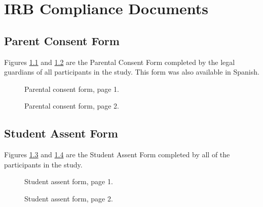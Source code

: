 \chapter{IRB Compliance Documents}


\section{Parent Consent Form}  \label{sec:parent_consent}
	Figures \ref{fig:consent1} and \ref{fig:consent2} are the Parental Consent Form completed by the legal guardians of all participants in the study. This form was also available in Spanish.
	

	
	\begin{figure}%
   	\centering
   	\caption{Parental consent form, page 1.}
   	\label{fig:consent1}
	\end{figure}

	\begin{figure}%
   	\centering
   	\caption{Parental consent form, page 2.}
   	\label{fig:consent2}
	\end{figure}

\section{Student Assent Form} \label{sec:student_assent}
	
	Figures \ref{fig:assent1} and \ref{fig:assent2} are the Student Assent Form completed by all of the participants in the study. 

	
	\begin{figure}%
   	\centering
   	\caption{Student assent form, page 1.}
   	\label{fig:assent1}
	\end{figure}
	
	\begin{figure}%
   	\centering
   	\caption{Student assent form, page 2.}
   	\label{fig:assent2}
	\end{figure}